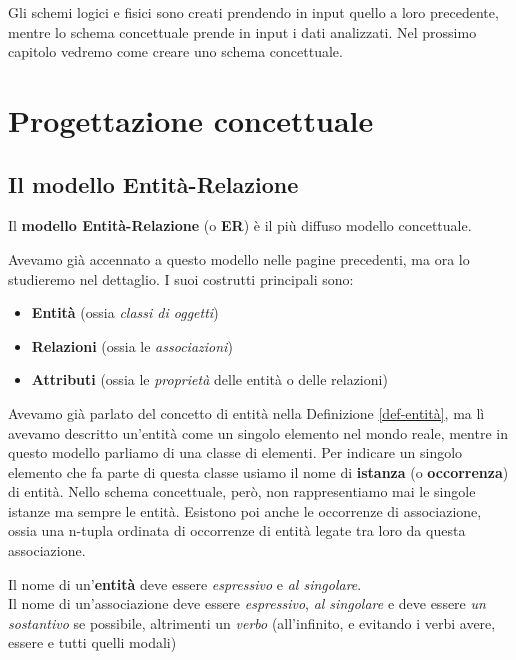 \documentclass[11pt, a4paper, titlepage, oneside]{scrbook}
\begin{document}
Gli schemi logici e fisici sono creati prendendo in input quello a loro precedente, mentre lo schema concettuale prende in input i dati analizzati. Nel prossimo capitolo vedremo come creare uno schema concettuale.

\chapter{Progettazione concettuale}

\section{Il modello Entità-Relazione}

\begin{Definizione}
\label{def-modello-ER}
Il \textbf{modello Entità-Relazione} (o \textbf{ER}) è il più diffuso modello concettuale.
\end{Definizione}

Avevamo già accennato a questo modello nelle pagine precedenti, ma ora lo studieremo nel dettaglio. I suoi costrutti principali sono:
\begin{itemize}
    \item \textbf{Entità} (ossia \textit{classi di oggetti})
    \item \textbf{Relazioni} (ossia le \textit{associazioni})
    \item \textbf{Attributi} (ossia le \textit{proprietà} delle entità o delle relazioni)
\end{itemize}

\NB Avevamo già parlato del concetto di entità nella Definizione \ref{def-entità}, ma lì avevamo descritto un'entità come un singolo elemento nel mondo reale, mentre in questo modello parliamo di una classe di elementi. Per indicare un singolo elemento che fa parte di questa classe usiamo il nome di \textbf{istanza} (o \textbf{occorrenza}) di entità. Nello schema concettuale, però, non rappresentiamo mai le singole istanze ma sempre le entità. Esistono poi anche le occorrenze di associazione, ossia una n-tupla ordinata di occorrenze di entità legate tra loro da questa associazione.

\begin{Proprieta}
\label{prop-convenzioni-nomi-entita-associazioni}
Il nome di un'\textbf{entità} deve essere \textit{espressivo} e \textit{al singolare}. \\
Il nome di un'associazione deve essere \textit{espressivo}, \textit{al singolare} e deve essere \textit{un sostantivo} se possibile, altrimenti un \textit{verbo} (all'infinito, e evitando i verbi avere, essere e tutti quelli modali)
\end{Proprieta}
\end{document}
